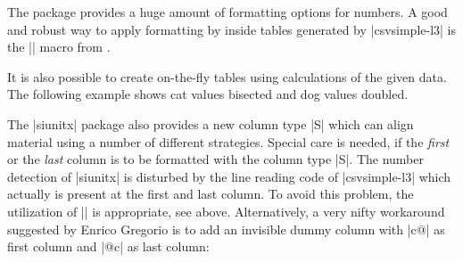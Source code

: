 \documentclass[a4paper,11pt]{ltxdoc}
\begin{document}

\medskip

The  package provides a huge amount of formatting options for
numbers. A good and robust way to apply formatting by  inside
tables generated by |csvsimple-l3| is the |\tablenum| macro from
.

\begin{dispExample}
\end{dispExample}

\clearpage

It is also possible to create on-the-fly tables using calculations of
the given data. The following example shows cat values bisected and
dog values doubled.

\begin{dispExample}
\end{dispExample}


\clearpage

The |siunitx| package also provides a new column type |S|
which can align material using a number of different strategies.
Special care is needed, if the \emph{first} or the \emph{last} column is to be formatted with
the column type |S|. The number detection of |siunitx| is disturbed by
the line reading code of |csvsimple-l3| which actually is present at the
first and last column. To avoid this problem, the utilization of
|\tablenum| is appropriate, see above.
Alternatively, a very nifty workaround suggested by Enrico Gregorio is to
add an invisible dummy column with |c@{}| as first column
and |@{}c| as last column:
\end{document}
